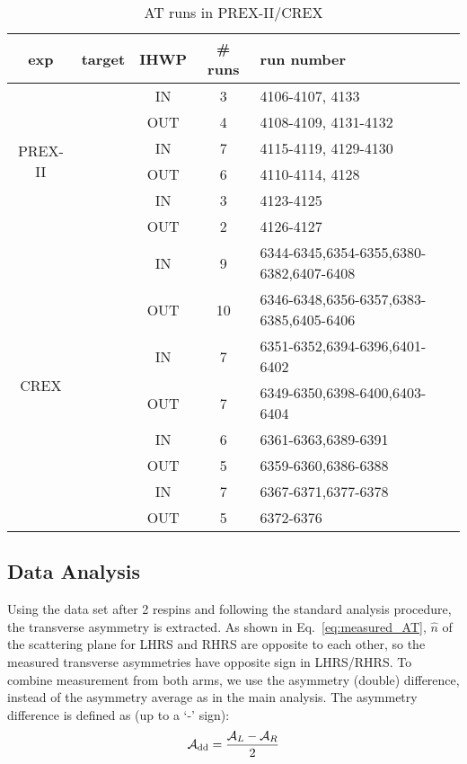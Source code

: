 \begin{table}[!h]
    \centering
    \begin{tabular}{c | c | c | c | l}
	\hline
	exp & target	& IHWP	& \# runs    & run number    \\
	\hline
	\multirow{6}{*}{PREX-II}    & \multirow{2}{*}{\Carbon}   & IN    & 3	& 4106-4107, 4133    \\
	    &   & OUT   & 4 & 4108-4109, 4131-4132   \\
	    \cline{2-5}
	    & \multirow{2}{*}{\Pb}  & IN    & 7	& 4115-4119, 4129-4130  \\
	    &	& OUT	& 6 & 4110-4114, 4128   \\
	    \cline{2-5}
	    & \multirow{2}{*}{\ca}  & IN    & 3	& 4123-4125	\\
	    &	& OUT	& 2 & 4126-4127 \\
	\hline
	\multirow{8}{*}{CREX}	& \multirow{2}{*}{\Ca}	& IN	& 9 & 6344-6345,6354-6355,6380-6382,6407-6408\\
	    &	& OUT	& 10	& 6346-6348,6356-6357,6383-6385,6405-6406   \\
	    \cline{2-5}
	    & \multirow{2}{*}{\ca}	& IN	& 7 & 6351-6352,6394-6396,6401-6402	\\
	    &	& OUT	& 7 & 6349-6350,6398-6400,6403-6404	\\
	    \cline{2-5}
	    & \multirow{2}{*}{\Carbon}	& IN	& 6 & 6361-6363,6389-6391	\\
	    &	& OUT	& 5 & 6359-6360,6386-6388	\\
	    \cline{2-5}
	    & \multirow{2}{*}{\Pb}	& IN	& 7 & 6367-6371,6377-6378	\\
	    &	& OUT	& 5 & 6372-6376 \\
	\hline
    \end{tabular}
    \caption{AT runs in PREX-II/CREX}
\end{table}

\subsection{Data Analysis}
Using the data set after 2 respins and following the standard analysis procedure, 
the transverse asymmetry is extracted. As shown in Eq.~\ref{eq:measured_AT},
$\hat{n}$ of the scattering plane for LHRS and RHRS are opposite to each other,
so the measured transverse asymmetries have opposite sign in LHRS/RHRS. To
combine measurement from both arms, we use the asymmetry (double) difference, 
instead of the asymmetry average as in the main analysis. The asymmetry difference
is defined as (up to a `-' sign):
\begin{equation}
    \mathcal{A}_{\text{dd}} = \frac{\mathcal{A}_L - \mathcal{A}_R}{2}
\end{equation}


